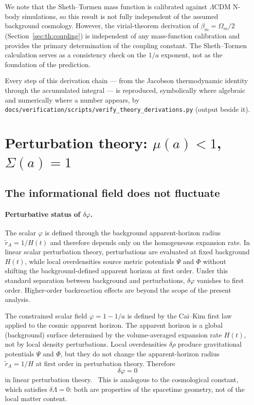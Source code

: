 We note that the Sheth--Tormen mass function is calibrated against $\Lambda$CDM N-body simulations, so this result is not fully independent of the
assumed background cosmology. However, the virial-theorem derivation of $\beta_m=\Omega_m/2$ (Section~\ref{sec:th:coupling}) is independent of any mass-function
calibration and provides the primary determination of the coupling constant. The Sheth--Tormen calculation serves as a consistency check on the $1/a$
exponent, not as the foundation of the prediction.

Every step of this derivation chain --- from the Jacobson thermodynamic identity through the accumulated integral --- is reproduced, symbolically
where algebraic and numerically where a number appears, by \texttt{docs/verification/scripts/\allowbreak{}verify\_theory\_derivations.py} (output beside it).

\section{Perturbation theory: $\mu(a)<1$, $\Sigma(a)=1$}\label{sec:th:pert}
\subsection{The informational field does not fluctuate}
\paragraph{Perturbative status of $\delta\varphi$.} The scalar $\varphi$ is defined through the background apparent-horizon radius $\tilde r_A=1/H(t)$
and therefore depends only on the homogeneous expansion rate. In linear scalar perturbation theory, perturbations are evaluated at fixed background
$H(t)$, while local overdensities source metric potentials $\Psi$ and $\Phi$ without shifting the background-defined apparent horizon at first order.
Under this standard separation between background and perturbations, $\delta\varphi$ vanishes to first order. Higher-order backreaction effects are
beyond the scope of the present analysis. \derived

The constrained scalar field $\varphi=1-1/a$ is defined by the Cai--Kim first law~\cite{CaiKim2005} applied to the cosmic apparent horizon. The apparent horizon is a
global (background) surface determined by the volume-averaged expansion rate $H(t)$, not by local density perturbations. Local overdensities $\delta\rho$
produce gravitational potentials $\Psi$ and $\Phi$, but they do not change the apparent-horizon radius $\tilde r_A=1/H$ at first order in perturbation
theory. Therefore
\begin{equation}\delta\varphi=0\label{eq:th:dphi}\end{equation}
in linear perturbation theory. \derived\ This is analogous to the cosmological constant, which satisfies $\delta\Lambda=0$: both are properties of the
spacetime geometry, not of the local matter content.

